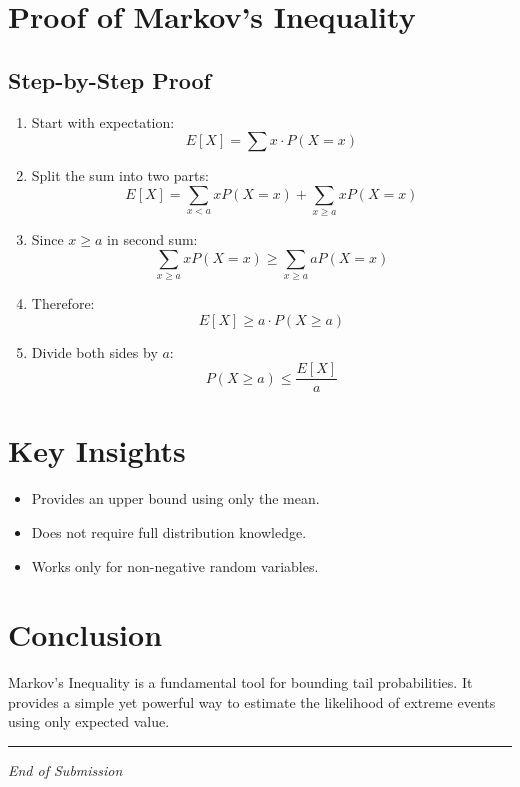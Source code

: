 \documentclass[11pt]{article}
\begin{document}
\section{Proof of Markov’s Inequality}

\subsection*{Step-by-Step Proof}

\begin{enumerate}
    \item Start with expectation:
    \[
    E[X] = \sum x \cdot P(X = x)
    \]

    \item Split the sum into two parts:
    \[
    E[X] = \sum_{x < a} xP(X=x) + \sum_{x \geq a} xP(X=x)
    \]

    \item Since $x \geq a$ in second sum:
    \[
    \sum_{x \geq a} xP(X=x) \geq \sum_{x \geq a} aP(X=x)
    \]

    \item Therefore:
    \[
    E[X] \geq a \cdot P(X \geq a)
    \]

    \item Divide both sides by $a$:
    \[
    P(X \geq a) \leq \frac{E[X]}{a}
    \]
\end{enumerate}

\section{Key Insights}

\begin{itemize}
    \item Provides an upper bound using only the mean.
    \item Does not require full distribution knowledge.
    \item Works only for non-negative random variables.
\end{itemize}

\section{Conclusion}

Markov’s Inequality is a fundamental tool for bounding tail probabilities. It provides a simple yet powerful way to estimate the likelihood of extreme events using only expected value.

\bigskip
\hrule
\vspace{0.2cm}
\begin{center}
    \small \textit{End of Submission}
\end{center}
\end{document}
